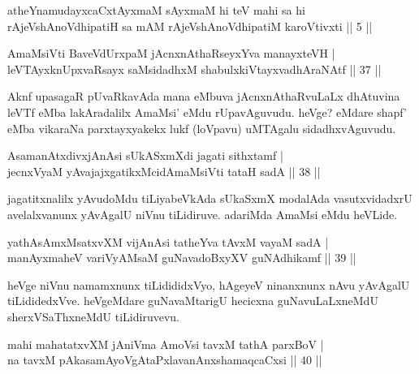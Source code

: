 \begin{kandikeshl}
atheYnamudayxcaCxtAyxmaM sAyxmaM hi teV mahi sa hi rAjeVshAnoV\s dhipatiH sa mAM rAjeVshAnoV\s dhipatiM karoVtivxti || 5 ||
\end{kandikeshl}


\begin{shl}
AmaMsiVti BaveVdUrxpaM jAcnxnAthaRseyxYva manayxteVH | \\
leVTAyxknUpxvaRsayx saMsidadhxM shabulxkiVtayxvadhAraNAtf \hfill|| 37 || 
\end{shl}

\begin{artha}
Aknf upasagaR pUvaRkavAda mana eMbuva jAcnxnAthaRvuLaLx dhAtuvina leVTf eMba lakAradalilx AmaMsi' eMdu rUpavAguvudu. heVge? eMdare shapf' eMba vikaraNa parxtayxyakekx lukf (loVpavu) uMTAgalu sidadhxvAguvudu.
\end{artha}


\begin{shl}
AsamanAtxdivxjAnAsi sUkASxmXdi jagati sithxtamf | \\
jecnxVyaM yAvajajxgatikxMcidAmaMsiVti tataH sadA \hfill|| 38 || 
\end{shl}

\begin{artha}
jagatitxnalilx yAvudoMdu tiLiyabeVkAda sUkaSxmX modalAda vasutxvidadxrU avelalxvanunx yAvAgalU niVnu tiLidiruve. adariMda AmaMsi eMdu heVLide.
\end{artha}


\begin{shl}
yathA\s sAmxMsatxvXM vijAnAsi tatheYva tAvxM vayaM sadA | \\
manAyxmaheV variVyAMsaM guNavadoBxyXV guNAdhikamf \hfill|| 39 || 
\end{shl}

\begin{artha}
heVge niVnu namamxnunx tiLidididxVyo, hAgeyeV ninanxnunx nAvu yAvAgalU tiLididedxVve. heVgeMdare guNavaMtarigU hecicxna guNavuLaLxneMdU sherxVSaThxneMdU tiLidiruvevu.
\end{artha}


\begin{shl}
mahi mahatatxvXM jAniVma AmoV\s si tavxM tathA parxBoV | \\
na tavxM pAkasamAyoVgAtaPxlavanAnxshamaqcaCxsi \hfill|| 40 || 
\end{shl}

